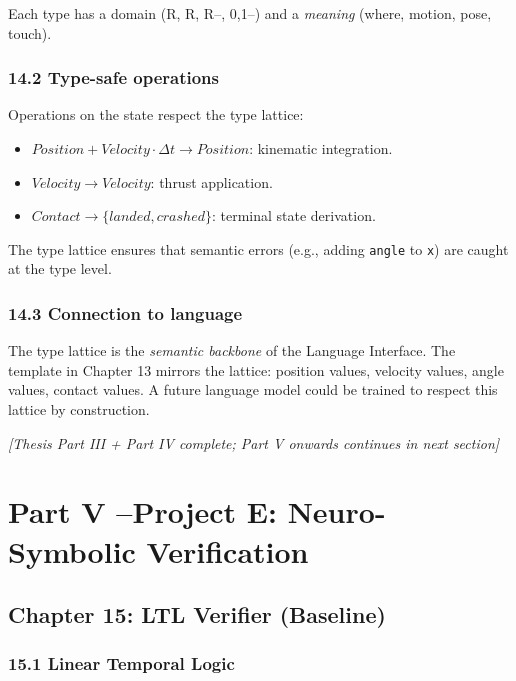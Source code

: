 \documentclass[11pt]{article}
\begin{document}
Each type has a domain (R, R, R--, {0,1}--) and a \textit{meaning} (where, motion, pose,
touch).

\subsubsection{14.2 Type-safe operations}

Operations on the state respect the type lattice:

\begin{itemize}
  \item $\mathit{Position} + \mathit{Velocity} \cdot \Delta t \to \mathit{Position}$: kinematic integration.
  \item $\mathit{Velocity} \to \mathit{Velocity}$: thrust application.
  \item $\mathit{Contact} \to \{\mathit{landed},\mathit{crashed}\}$: terminal state derivation.
\end{itemize}


The type lattice ensures that semantic errors (e.g., adding \texttt{angle} to \texttt{x}) are
caught at the type level.

\subsubsection{14.3 Connection to language}

The type lattice is the \textit{semantic backbone} of the Language Interface. The
template in Chapter 13 mirrors the lattice: position values, velocity values,
angle values, contact values. A future language model could be trained to
respect this lattice by construction.

\hrulefill

\textit{[Thesis Part III + Part IV complete; Part V onwards continues in next section]}


\section{Part V --Project E: Neuro-Symbolic Verification}

\subsection{Chapter 15: LTL Verifier (Baseline)}

\subsubsection{15.1 Linear Temporal Logic}
\end{document}
